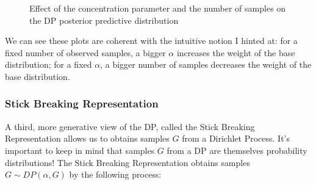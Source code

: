 \documentclass[11pt]{article}
\begin{document}
	
\begin{figure}[H]
	\caption{Effect of the concentration parameter and the number of samples
		on the DP posterior predictive distribution}
\end{figure}
	
We can see these plots are coherent with the intuitive notion I hinted
at: for a fixed number of observed samples, a bigger \(\alpha\)
increases the weight of the base distribution; for a fixed \(\alpha\), a
bigger number of samples decreases the weight of the base distribution.
	
\subsubsection{Stick Breaking Representation}\label{stick-breaking-representation}
	
A third, more generative view of the DP, called the Stick Breaking
Representation allows us to obtains samples \(G\) from a Dirichlet
Process. It's important to keep in mind that samples \(G\) from a DP are
themselves probability distributions! The Stick Breaking Representation
obtains samples \(G \sim DP(\alpha, G)\) by the following process:
	
\end{document}
